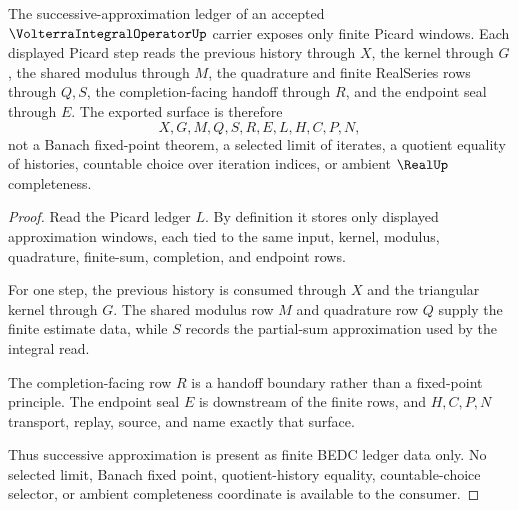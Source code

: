 \begin{theorem}
\label{thm:volterra-integral-operator-successive-approximation-surface}
The successive-approximation ledger of an accepted $\VolterraIntegralOperatorUp$ carrier exposes only finite Picard windows. Each displayed Picard step reads the previous history through $X$, the kernel through $G$, the shared modulus through $M$, the quadrature and finite RealSeries rows through $Q,S$, the completion-facing handoff through $R$, and the endpoint seal through $E$. The exported surface is therefore
$$
X,G,M,Q,S,R,E,L,H,C,P,N ,
$$
not a Banach fixed-point theorem, a selected limit of iterates, a quotient equality of histories, countable choice over iteration indices, or ambient $\RealUp$ completeness.
\end{theorem}
\begin{proof}
Read the Picard ledger $L$. By definition it stores only displayed approximation windows, each tied to the same input, kernel, modulus, quadrature, finite-sum, completion, and endpoint rows.

For one step, the previous history is consumed through $X$ and the triangular kernel through $G$. The shared modulus row $M$ and quadrature row $Q$ supply the finite estimate data, while $S$ records the partial-sum approximation used by the integral read.

The completion-facing row $R$ is a handoff boundary rather than a fixed-point principle. The endpoint seal $E$ is downstream of the finite rows, and $H,C,P,N$ transport, replay, source, and name exactly that surface.

Thus successive approximation is present as finite BEDC ledger data only. No selected limit, Banach fixed point, quotient-history equality, countable-choice selector, or ambient completeness coordinate is available to the consumer.
\end{proof}




